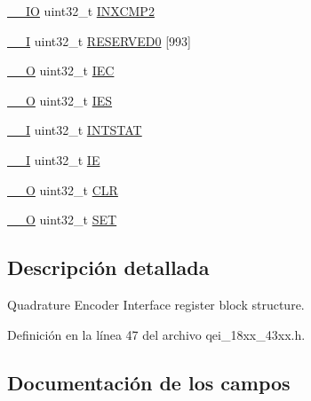 \begin{DoxyCompactItemize}
\item 
\hyperlink{core__sc300_8h_aec43007d9998a0a0e01faede4133d6be}{\+\_\+\+\_\+\+IO} uint32\+\_\+t \hyperlink{struct_l_p_c___q_e_i___t_ad5eb9db7a4d2c373a59aac35536728b0}{I\+N\+X\+C\+M\+P2}
\item 
\hyperlink{core__sc300_8h_af63697ed9952cc71e1225efe205f6cd3}{\+\_\+\+\_\+I} uint32\+\_\+t \hyperlink{struct_l_p_c___q_e_i___t_a37862d4673a884c0accc80fd33dc1009}{R\+E\+S\+E\+R\+V\+E\+D0} \mbox{[}993\mbox{]}
\item 
\hyperlink{core__sc300_8h_a7e25d9380f9ef903923964322e71f2f6}{\+\_\+\+\_\+O} uint32\+\_\+t \hyperlink{struct_l_p_c___q_e_i___t_a27bc3681e53ef35db122c10645159e03}{I\+EC}
\item 
\hyperlink{core__sc300_8h_a7e25d9380f9ef903923964322e71f2f6}{\+\_\+\+\_\+O} uint32\+\_\+t \hyperlink{struct_l_p_c___q_e_i___t_ab86388e5b1214b3560d109dfa5ea9965}{I\+ES}
\item 
\hyperlink{core__sc300_8h_af63697ed9952cc71e1225efe205f6cd3}{\+\_\+\+\_\+I} uint32\+\_\+t \hyperlink{struct_l_p_c___q_e_i___t_a0bbac120700e7e8084acf696d17068ab}{I\+N\+T\+S\+T\+AT}
\item 
\hyperlink{core__sc300_8h_af63697ed9952cc71e1225efe205f6cd3}{\+\_\+\+\_\+I} uint32\+\_\+t \hyperlink{struct_l_p_c___q_e_i___t_a4ceb68d36834fd8bf5529677d0a4afb1}{IE}
\item 
\hyperlink{core__sc300_8h_a7e25d9380f9ef903923964322e71f2f6}{\+\_\+\+\_\+O} uint32\+\_\+t \hyperlink{struct_l_p_c___q_e_i___t_a655b86dd7ae73a3e7deb3ba42078f0a8}{C\+LR}
\item 
\hyperlink{core__sc300_8h_a7e25d9380f9ef903923964322e71f2f6}{\+\_\+\+\_\+O} uint32\+\_\+t \hyperlink{struct_l_p_c___q_e_i___t_a0c0c9e0fcf2cd860d7b5328ce56b88c9}{S\+ET}
\end{DoxyCompactItemize}


\subsection{Descripción detallada}
Quadrature Encoder Interface register block structure. 

Definición en la línea 47 del archivo qei\+\_\+18xx\+\_\+43xx.\+h.



\subsection{Documentación de los campos}

